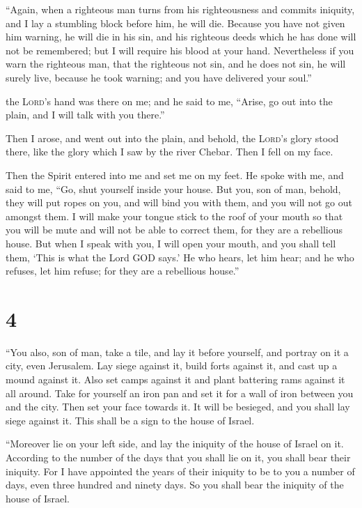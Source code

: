 ``Again, when a righteous man turns from his
righteousness and commits iniquity, and I lay a stumbling block before
him, he will die. Because you have not given him warning, he will die in
his sin, and his righteous deeds which he has done will not be
remembered; but I will require his blood at your hand. 
Nevertheless if you warn the righteous man, that the righteous not sin,
and he does not sin, he will surely live, because he took warning; and
you have delivered your soul.''

 the \textsc{Lord}'s hand was there on me; and he said to
me, ``Arise, go out into the plain, and I will talk with you there.''

 Then I arose, and went out into the plain, and behold,
the \textsc{Lord}'s glory stood there, like the glory which I saw by the
river Chebar. Then I fell on my face.

 Then the Spirit entered into me and set me on my feet.
He spoke with me, and said to me, ``Go, shut yourself inside your house.
 But you, son of man, behold, they will put ropes on you,
and will bind you with them, and you will not go out amongst them.
 I will make your tongue stick to the roof of your mouth
so that you will be mute and will not be able to correct them, for they
are a rebellious house.  But when I speak with you, I
will open your mouth, and you shall tell them, `This is what the Lord
GOD says.' He who hears, let him hear; and he who refuses, let him
refuse; for they are a rebellious house.''

\hypertarget{section-3}{%
\section{4}\label{section-3}}

 ``You also, son of man, take a tile, and lay it before
yourself, and portray on it a city, even Jerusalem.  Lay
siege against it, build forts against it, and cast up a mound against
it. Also set camps against it and plant battering rams against it all
around.  Take for yourself an iron pan and set it for a
wall of iron between you and the city. Then set your face towards it. It
will be besieged, and you shall lay siege against it. This shall be a
sign to the house of Israel.

 ``Moreover lie on your left side, and lay the iniquity of
the house of Israel on it. According to the number of the days that you
shall lie on it, you shall bear their iniquity.  For I
have appointed the years of their iniquity to be to you a number of
days, even three hundred and ninety days. So you shall bear the iniquity
of the house of Israel.

